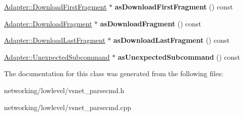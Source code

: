 \begin{DoxyCompactItemize}
\item 
\hyperlink{structVsnetDownload_1_1Adapter_1_1DownloadFirstFragment}{Adapter\+::\+Download\+First\+Fragment} $\ast$ {\bfseries as\+Download\+First\+Fragment} () const \hypertarget{classVsnetDownload_1_1RecvCmdDownload_aaf7be28240c34a0c14b9222131d33f63}{}\label{classVsnetDownload_1_1RecvCmdDownload_aaf7be28240c34a0c14b9222131d33f63}

\item 
\hyperlink{structVsnetDownload_1_1Adapter_1_1DownloadFragment}{Adapter\+::\+Download\+Fragment} $\ast$ {\bfseries as\+Download\+Fragment} () const \hypertarget{classVsnetDownload_1_1RecvCmdDownload_a145ad4d92c8dfe23fda487adcac2e86f}{}\label{classVsnetDownload_1_1RecvCmdDownload_a145ad4d92c8dfe23fda487adcac2e86f}

\item 
\hyperlink{structVsnetDownload_1_1Adapter_1_1DownloadLastFragment}{Adapter\+::\+Download\+Last\+Fragment} $\ast$ {\bfseries as\+Download\+Last\+Fragment} () const \hypertarget{classVsnetDownload_1_1RecvCmdDownload_abbc0edfb3b89770798de9402d6564b9b}{}\label{classVsnetDownload_1_1RecvCmdDownload_abbc0edfb3b89770798de9402d6564b9b}

\item 
\hyperlink{structVsnetDownload_1_1Adapter_1_1UnexpectedSubcommand}{Adapter\+::\+Unexpected\+Subcommand} $\ast$ {\bfseries as\+Unexpected\+Subcommand} () const \hypertarget{classVsnetDownload_1_1RecvCmdDownload_ad788beb3a82a3d5f0d37c6d0ce9c1331}{}\label{classVsnetDownload_1_1RecvCmdDownload_ad788beb3a82a3d5f0d37c6d0ce9c1331}

\end{DoxyCompactItemize}


The documentation for this class was generated from the following files\+:\begin{DoxyCompactItemize}
\item 
networking/lowlevel/vsnet\+\_\+parsecmd.\+h\item 
networking/lowlevel/vsnet\+\_\+parsecmd.\+cpp\end{DoxyCompactItemize}
